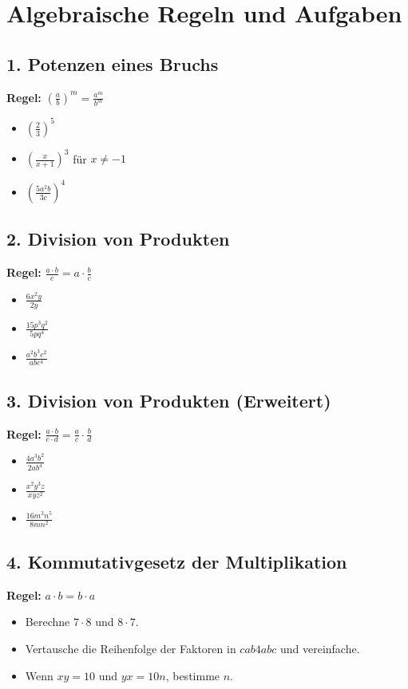 \documentclass{article}
\begin{document}
\section*{Algebraische Regeln und Aufgaben}

\subsection*{1. Potenzen eines Bruchs}
\textbf{Regel:} \( (\frac{a}{b})^m = \frac{a^m}{b^m} \)
\begin{itemize}
    \item \( \left(\frac{2}{3}\right)^5 \)
    \item \( \left(\frac{x}{x+1}\right)^3 \) für \( x \neq -1 \)
    \item \( \left(\frac{5a^2b}{3c}\right)^4 \)
\end{itemize}

\subsection*{2. Division von Produkten}
\textbf{Regel:} \( \frac{a \cdot b}{c} = a \cdot \frac{b}{c} \)
\begin{itemize}
    \item \( \frac{6x^2y}{2y} \)
    \item \( \frac{15p^3q^2}{5pq^4} \)
    \item \( \frac{a^2b^3c^2}{abc^4} \)
\end{itemize}

\subsection*{3. Division von Produkten (Erweitert)}
\textbf{Regel:} \( \frac{a \cdot b}{c \cdot d} = \frac{a}{c} \cdot \frac{b}{d} \)
\begin{itemize}
    \item \( \frac{4a^3b^2}{2ab^4} \)
    \item \( \frac{x^2y^3z}{xyz^2} \)
    \item \( \frac{16m^3n^5}{8mn^2} \)
\end{itemize}

\subsection*{4. Kommutativgesetz der Multiplikation}
\textbf{Regel:} \( a \cdot b = b \cdot a \)
\begin{itemize}
    \item Berechne \( 7 \cdot 8 \) und \( 8 \cdot 7 \).
    \item Vertausche die Reihenfolge der Faktoren in \( cab4abc \) und vereinfache.
    \item Wenn \( xy = 10 \) und \( yx = 10n \), bestimme \( n \).
\end{itemize}
\end{document}
